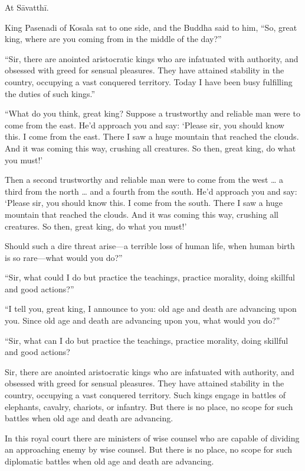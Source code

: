 \documentclass[12pt,openany]{book}%
\begin{document}
At \textsanskrit{Sāvatthī}. 

King Pasenadi of Kosala sat to one side, and the Buddha said to him, “So, great king, where are you coming from in the middle of the day?” 

“Sir, there are anointed aristocratic kings who are infatuated with authority, and obsessed with greed for sensual pleasures. They have attained stability in the country, occupying a vast conquered territory. Today I have been busy fulfilling the duties of such kings.” 

“What do you think, great king? Suppose a trustworthy and reliable man were to come from the east. He’d approach you and say: ‘Please sir, you should know this. I come from the east. There I saw a huge mountain that reached the clouds. And it was coming this way, crushing all creatures. So then, great king, do what you must!’ 

Then a second trustworthy and reliable man were to come from the west … a third from the north … and a fourth from the south. He’d approach you and say: ‘Please sir, you should know this. I come from the south. There I saw a huge mountain that reached the clouds. And it was coming this way, crushing all creatures. So then, great king, do what you must!’ 

Should such a dire threat arise—a terrible loss of human life, when human birth is so rare—what would you do?” 

“Sir, what could I do but practice the teachings, practice morality, doing skillful and good actions?” 

“I tell you, great king, I announce to you: old age and death are advancing upon you. Since old age and death are advancing upon you, what would you do?” 

“Sir, what can I do but practice the teachings, practice morality, doing skillful and good actions? 

Sir, there are anointed aristocratic kings who are infatuated with authority, and obsessed with greed for sensual pleasures. They have attained stability in the country, occupying a vast conquered territory. Such kings engage in battles of elephants, cavalry, chariots, or infantry. But there is no place, no scope for such battles when old age and death are advancing. 

In this royal court there are ministers of wise counsel who are capable of dividing an approaching enemy by wise counsel. But there is no place, no scope for such diplomatic battles when old age and death are advancing. 
\end{document}
